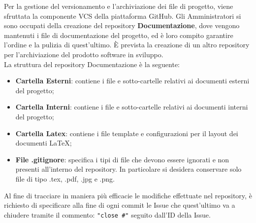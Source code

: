 			Per la gestione del versionamento e l'archiviazione dei file di progetto, viene sfruttata la componente VCS della piattaforma GitHub. Gli Amministratori si sono occupati della creazione del repository \textbf{Documentazione}, dove vengono mantenuti i file di documentazione del progetto, ed è loro compito garantire l'ordine e la pulizia di quest'ultimo. È prevista la creazione di un altro repository per l'archiviazione del prodotto software in sviluppo. \\
			La struttura del repository Documentazione è la seguente:
			\begin{itemize}
				\item \textbf{Cartella Esterni}: contiene i file e sotto-cartelle relativi ai documenti esterni del progetto;
				\item \textbf{Cartella Interni}: contiene i file e sotto-cartelle relativi ai documenti interni del progetto;
				\item \textbf{Cartella Latex}: contiene i file template e configurazioni per il layout dei documenti \LaTeX{};
				\item \textbf{File .gitignore}: specifica i tipi di file che devono essere ignorati e non presenti all'interno del repository. In particolare si desidera conservare solo file di tipo .tex, .pdf, .jpg e .png.
			\end{itemize}
			Al fine di tracciare in maniera più efficacie le modifiche effettuate nel repository, è richiesto di specificare alla fine di ogni commit le Issue che quest'ultimo va a chiudere tramite il commento: \texttt{"close \#"} seguito dall'ID della Issue.
			
